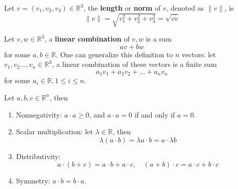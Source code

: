\documentclass[openany]{book}
\newcommand{\R}{\mathbb{R}}
\begin{document}
\begin{defn}
    Let $v=(v_1,v_2,v_3)\in\R^3$, the \textbf{length} or \textbf{norm} of $v$, denoted as $\|v\|$, is 
    \begin{equation*}
        \|v\|=\sqrt{v_1^2+v_2^2+v_3^2}=\sqrt{v\dot v}
    \end{equation*}
\end{defn}

\begin{defn}
    Let $v, w\in\R^3$, a \textbf{linear combination} of $v,w$ is a sum 
    \begin{equation*}
        av+bw
    \end{equation*}
    for some $a,b\in\R$. One can generalize this definition to $n$ vectors: let $v_1, v_2\dots, v_n\in\R^3$, a linear combination of these vectors is a finite sum 
    \begin{equation*}
        a_1v_1+a_2v_2+\dots+a_nv_n
    \end{equation*}
    for some $a_i\in\R, 1\leq i\leq n$. 
\end{defn}


\begin{prop}
    Let $a,b,c\in\R^n$, then 
    \begin{enumerate}
        \item[(a)] Nonnegativity: $a\cdot a\geq 0$, and $a\cdot a=0$ if and only if $a=0$.
        \item[(b)] Scalar multiplication: let $\lambda\in\R$, then 
        \begin{equation*}
            \lambda(a\cdot b)=\lambda a\cdot b=a\cdot \lambda b
        \end{equation*}
        \item[(c)] Distributivity:
        \begin{equation*}
            a\cdot(b+c)=a\cdot b+a\cdot c, \quad (a+b)\cdot c=a\cdot c+b\cdot c
        \end{equation*}
        \item[(d)] Symmetry: $a\cdot b=b\cdot a$.
    \end{enumerate}
\end{prop}


\end{document}
